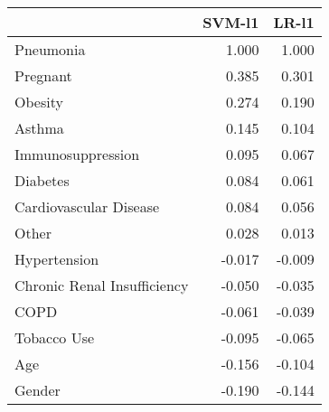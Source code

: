 \begin{tabular}{lrr}
\toprule
{} &  SVM-l1 &  LR-l1 \\
\midrule
Pneumonia                   &   1.000 &  1.000 \\
Pregnant                    &   0.385 &  0.301 \\
Obesity                     &   0.274 &  0.190 \\
Asthma                      &   0.145 &  0.104 \\
Immunosuppression           &   0.095 &  0.067 \\
Diabetes                    &   0.084 &  0.061 \\
Cardiovascular Disease      &   0.084 &  0.056 \\
Other                       &   0.028 &  0.013 \\
Hypertension                &  -0.017 & -0.009 \\
Chronic Renal Insufficiency &  -0.050 & -0.035 \\
COPD                        &  -0.061 & -0.039 \\
Tobacco Use                 &  -0.095 & -0.065 \\
Age                         &  -0.156 & -0.104 \\
Gender                      &  -0.190 & -0.144 \\
\bottomrule
\end{tabular}
